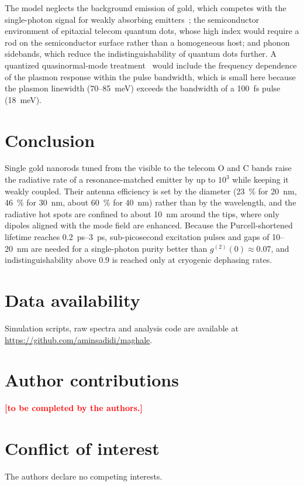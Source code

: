 \documentclass[11pt,a4paper]{article}
\newcommand{\TBD}[1]{\textcolor{red}{\textbf{[#1]}}}
\begin{document}
The model neglects the background emission of gold, which competes with the single-photon signal for weakly absorbing
emitters~\cite{yorulmaz2012,paper1}; the semiconductor environment of epitaxial telecom quantum dots, whose high index
would require a rod on the semiconductor surface rather than a homogeneous host; and phonon sidebands, which reduce the
indistinguishability of quantum dots further. A quantized quasinormal-mode treatment~\cite{franke2019,hughes2019} would
include the frequency dependence of the plasmon response within the pulse bandwidth, which is small here because the
plasmon linewidth (70--\SI{85}{meV}) exceeds the bandwidth of a \SI{100}{fs} pulse (\SI{18}{meV}).

\section{Conclusion}
Single gold nanorods tuned from the visible to the telecom O and C bands raise the radiative rate of a resonance-matched
emitter by up to $10^3$ while keeping it weakly coupled. Their antenna efficiency is set by the diameter
(\SI{23}{\percent} for \SI{20}{nm}, \SI{46}{\percent} for \SI{30}{nm}, about \SI{60}{\percent} for \SI{40}{nm}) rather
than by the wavelength, and the radiative hot spots are confined to about \SI{10}{nm} around the tips, where only
dipoles aligned with the mode field are enhanced. Because the Purcell-shortened lifetime reaches \SIrange{0.2}{3}{ps},
sub-picosecond excitation pulses and gaps of 10--\SI{20}{nm} are needed for a single-photon purity better than
$g^{(2)}(0)\approx0.07$, and indistinguishability above 0.9 is reached only at cryogenic dephasing rates.

\section*{Data availability}
Simulation scripts, raw spectra and analysis code are available at \url{https://github.com/aminsadidi/maghale}.

\section*{Author contributions}
\TBD{to be completed by the authors.}

\section*{Conflict of interest}
The authors declare no competing interests.


\end{document}
